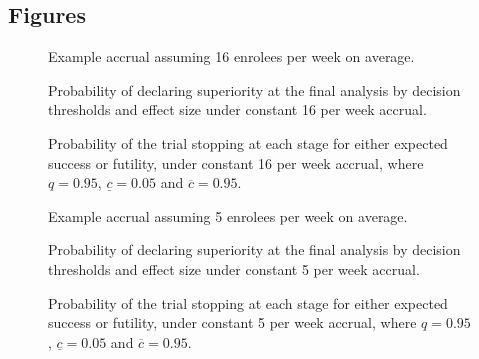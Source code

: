 \documentclass{bmcart}
\begin{document}
\begin{backmatter}


\section*{Figures}

\begin{figure}[!ht] 	  	  	  
	\caption{Example accrual assuming 16 enrolees per week on average.}
	\label{fig:accrual-16}
\end{figure}

\begin{figure}[!ht]
	\caption{Probability of declaring superiority at the final analysis by decision thresholds and effect size under constant 16 per week accrual.}
	\label{fig:decisions-16}
\end{figure}

\begin{figure}[!ht]
\caption{Probability of the trial stopping at each stage for either expected success or futility, under constant 16 per week accrual, where \(q=0.95\), \(\underline{c}=0.05\) and \(\overline{c}=0.95\).}\label{fig:stop-16}
\end{figure}


\begin{figure}[!ht] 	  	  	  
	\caption{Example accrual assuming 5 enrolees per week on average.}
	\label{fig:accrual-5}
\end{figure}

\begin{figure}[!ht]
	\caption{Probability of declaring superiority at the final analysis by decision thresholds and effect size under constant 5 per week accrual.}
	\label{fig:decisions-5}
\end{figure}

\begin{figure}[!ht]
	\caption{Probability of the trial stopping at each stage for either expected success or futility, under constant 5 per week accrual, where \(q=0.95\), \(\underline{c}=0.05\) and \(\overline{c}=0.95\).}\label{fig:stop-5}
\end{figure}


\end{backmatter}
\end{document}
